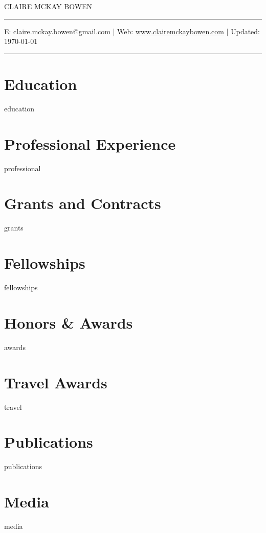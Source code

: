 \documentclass[11pt, letterpaper, roman]{moderncv} %
\begin{document}
\vspace{-10pt}
\centerline{\huge{CLAIRE MCKAY BOWEN}}
\vspace{10pt}
\hrule
\vspace{5pt}
\centerline{\small E: claire.mckay.bowen@gmail.com | Web: \href{https://www.clairemckaybowen.com}{www.clairemckaybowen.com} | Updated: \today}
\vspace{5pt}
\hrule

\section{Education}
{education}

\vspace{-10pt}
\section{Professional Experience}
{professional}
    
\vspace{-30pt}
\section{Grants and Contracts}
{grants}

\section{Fellowships}
{fellowships}

\section{Honors \& Awards}
{awards}

\section{Travel Awards}
{travel}
    
\newpage
\section{Publications}
{publications}

\section{Media}
{media}
\end{document}
